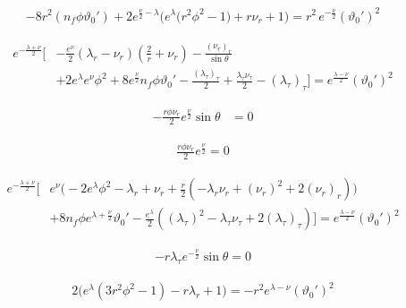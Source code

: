 \documentclass[12pt]{article}
\begin{document}
\begin{align*}
-8r^2 \left(n_f\phi\vartheta_0' \right)
+2e^{\frac{\nu}{2} - \lambda}
\Big( e^{\lambda} \big(r^2\phi^2 - 1 \big) + r\nu_{r} + 1\Big)
= r^2 \, e^{-\frac{\nu}{2}}(\vartheta_0')^2
\end{align*}

\begin{align*}
e^{-\frac{\lambda + \nu}{2}} \Big[
 &- \frac{e^{\nu}}{2} \left( \lambda_r - \nu_r \right) \left(\frac{2}{r} + \nu_r\right)
 - \frac{(\nu_r)_r}{\sin\theta} \\
 &+ 2 e^{\lambda} e^{\nu} \phi^2
 + 8 e^{\frac{\nu}{2}} n_f\phi\vartheta_0'
 - \frac{(\lambda_\tau)_\tau}{2} + \frac{\lambda_\tau \nu_\tau}{2} -(\lambda_\tau)_\tau
\Big] = e^\frac{\lambda - \nu}{2} (\vartheta_0')^2
\end{align*}

\begin{align*}
- \frac{r \phi \nu_r}{2} e^{\frac{\nu}{2}} \sin\theta &= 0
\end{align*}

\begin{align*}
\frac{r\phi\nu_r}{2} e^{\frac{\nu}{2}} = 0
\end{align*}

\begin{align*}
e^{-\frac{\lambda + \nu}{2}} \Big[
 & e^{\nu} \Big(
     - 2e^{\lambda}\phi^2 - \lambda_r + \nu_r 
      + \frac{r}{2} ( - \lambda_r \nu_r + (\nu_r)^2 + 2 (\nu_r)_r )
   \Big) \\
 & + 8 n_f \phi e^{\lambda + \frac{\nu}{2}} \vartheta_0' - \frac{e^{\lambda}}{2} (\left(\lambda_\tau\right)^2 - \lambda_\tau \nu_\tau + 2 (\lambda_\tau)_\tau)
\Big] = e^\frac{\lambda - \nu}{2}(\vartheta_0')^2
\end{align*}

\begin{align*}
- r \lambda_\tau e^{-\frac{\nu}{2}}\sin\theta = 0
\end{align*}

\begin{align*}
2 
\Big(
  e^{\lambda}(3r^2\phi^2 - 1) - r\lambda_r + 1
\Big)
= - r^2 
e^{\lambda-\nu} (\vartheta_0')^2
\end{align*}
\end{document}
